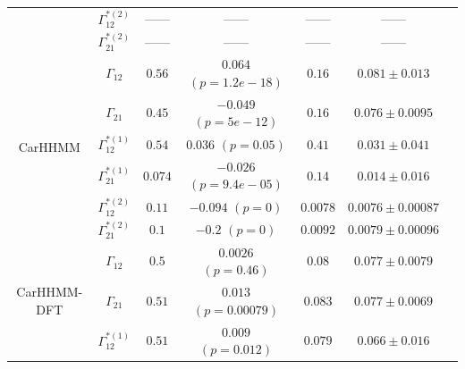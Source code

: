 \documentclass[12pt]{TD-CJS}
\begin{document}
{\begin{tabular}{ccccccc}
                             & $\Gamma^{*(2)}_{12}$          & ------                         & ------                   & ------                           & ------                                      \\
                             & $\Gamma^{*(2)}_{21}$          & ------                         & ------                   & ------                           & ------                                      \\ \hline
\multirow{6}{*}{CarHHMM}     & $\Gamma_{12}$                 & $0.56$                         & $0.064$ $(p=1.2e-18)$        & $0.16$                           & $0.081 \pm 0.013$                             \\
                             & $\Gamma_{21}$                 & $0.45$                         & $-0.049$ $(p=5e-12)$        & $0.16$                           & $0.076 \pm 0.0095$                             \\
                             & $\Gamma^{*(1)}_{12}$          & $0.54$                         & $0.036$ $(p=0.05)$        & $0.41$                           & $0.031 \pm 0.041$                             \\
                             & $\Gamma^{*(1)}_{21}$          & $0.074$                         & $-0.026$ $(p=9.4e-05)$        & $0.14$                           & $0.014 \pm 0.016$                             \\
                             & $\Gamma^{*(2)}_{12}$          & $0.11$                         & $-0.094$ $(p=0)$        & $0.0078$                           & $0.0076 \pm 0.00087$                             \\
                             & $\Gamma^{*(2)}_{21}$          & $0.1$                         & $-0.2$ $(p=0)$        & $0.0092$                           & $0.0079 \pm 0.00096$                             \\ \hline
\multirow{6}{*}{CarHHMM-DFT} & $\Gamma_{12}$                 & $0.5$                         & $0.0026$ $(p=0.46)$        & $0.08$                           & $0.077 \pm 0.0079$                             \\
                             & $\Gamma_{21}$                 & $0.51$                         & $0.013$ $(p=0.00079)$        & $0.083$                           & $0.077 \pm 0.0069$                             \\
                             & $\Gamma^{*(1)}_{12}$          & $0.51$                         & $0.009$ $(p=0.012)$        & $0.079$                           & $0.066 \pm 0.016$                             \\

\end{tabular}}
\end{document}
